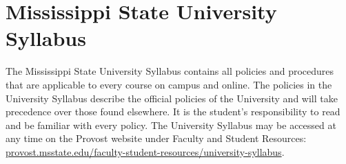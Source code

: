 \section{Mississippi State University Syllabus}

The Mississippi State University Syllabus contains all policies and procedures that are applicable to every course on campus and online. The policies in the University Syllabus describe the official policies of the University and will take precedence over those found elsewhere. It is the student's responsibility to read and be familiar with every policy. The University Syllabus may be accessed at any time on the Provost website under Faculty and Student Resources: 
\href{https://www.provost.msstate.edu/faculty-student-resources/university-syllabus}{\url{provost.msstate.edu/faculty-student-resources/university-syllabus}}.
